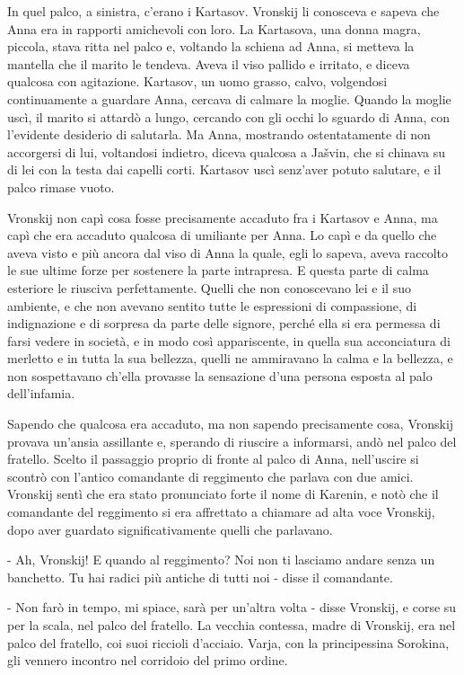 In quel palco, a sinistra, c'erano i Kartasov. Vronskij li conosceva e sapeva che Anna era in rapporti amichevoli con loro. La Kartasova, una donna magra, piccola, stava ritta nel palco e, voltando la schiena ad Anna, si metteva la mantella che il marito le tendeva. Aveva il viso pallido e irritato, e diceva qualcosa con agitazione. Kartasov, un uomo grasso, calvo, volgendosi continuamente a guardare Anna, cercava di calmare la moglie. Quando la moglie uscì, il marito si attardò a lungo, cercando con gli occhi lo sguardo di Anna, con l'evidente desiderio di salutarla. Ma Anna, mostrando ostentatamente di non accorgersi di lui, voltandosi indietro, diceva qualcosa a Jašvin, che si chinava su di lei con la testa dai capelli corti. Kartasov uscì senz'aver potuto salutare, e il palco rimase vuoto. 

Vronskij non capì cosa fosse precisamente accaduto fra i Kartasov e Anna, ma capì che era accaduto qualcosa di umiliante per Anna. Lo capì e da quello che aveva visto e più ancora dal viso di Anna la quale, egli lo sapeva, aveva raccolto le sue ultime forze per sostenere la parte intrapresa. E questa parte di calma esteriore le riusciva perfettamente. Quelli che non conoscevano lei e il suo ambiente, e che non avevano sentito tutte le espressioni di compassione, di indignazione e di sorpresa da parte delle signore, perché ella si era permessa di farsi vedere in società, e in modo così appariscente, in quella sua acconciatura di merletto e in tutta la sua bellezza, quelli ne ammiravano la calma e la bellezza, e non sospettavano ch'ella provasse la sensazione d'una persona esposta al palo dell'infamia. 

Sapendo che qualcosa era accaduto, ma non sapendo precisamente cosa, Vronskij provava un'ansia assillante e, sperando di riuscire a informarsi, andò nel palco del fratello. Scelto il passaggio proprio di fronte al palco di Anna, nell'uscire si scontrò con l'antico comandante di reggimento che parlava con due amici. Vronskij sentì che era stato pronunciato forte il nome di Karenin, e notò che il comandante del reggimento si era affrettato a chiamare ad alta voce Vronskij, dopo aver guardato significativamente quelli che parlavano. 

- Ah, Vronskij! E quando al reggimento? Noi non ti lasciamo andare senza un banchetto. Tu hai radici più antiche di tutti noi - disse il comandante. 

- Non farò in tempo, mi spiace, sarà per un'altra volta - disse Vronskij, e corse su per la scala, nel palco del fratello. La vecchia contessa, madre di Vronskij, era nel palco del fratello, coi suoi riccioli d'acciaio. Varja, con la principessina Sorokina, gli vennero incontro nel corridoio del primo ordine. 

